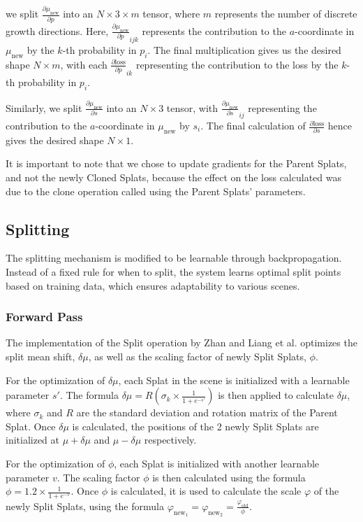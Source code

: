 \documentclass[11pt]{report}
\begin{document}
we split $\frac{\partial \mu_{\text{new}}}{\partial p}$ into an $N \times 3 \times m$ tensor, where $m$ represents the number of discrete growth directions. Here, $\frac{\partial \mu_{\text{new}}}{\partial p}_{ijk}$ represents the contribution to the $a$-coordinate in $\mu_{\text{new}}$ by the $k$-th probability in $p_i$. The final multiplication gives us the desired shape $N \times m$, with each $\frac{\partial \text{loss}}{\partial p}_{ik}$ representing the contribution to the loss by the $k$-th probability in $p_i$.

Similarly, we split $\frac{\partial \mu_{\text{new}}}{\partial s}$ into an $N \times 3$ tensor, with $\frac{\partial \mu_{\text{new}}}{\partial s}_{ij}$ representing the contribution to the $a$-coordinate in $\mu_{\text{new}}$ by $s_{i}$. The final calculation of $\frac{\partial \text{loss}}{\partial s}$ hence gives the desired shape $N \times 1$.

It is important to note that we chose to update gradients for the Parent Splats, and not the newly Cloned Splats, because the effect on the loss calculated was due to the clone operation called using the Parent Splats' parameters.

\subsection{Splitting}
The splitting mechanism is modified to be learnable through backpropagation. Instead of a fixed rule for when to split, the system learns optimal split points based on training data, which ensures adaptability to various scenes.

\subsubsection{Forward Pass}
The implementation of the Split operation by Zhan and Liang et al. optimizes the split mean shift, $\delta \mu$, as well as the scaling factor of newly Split Splats, $\phi$.

For the optimization of $\delta \mu$, each Splat in the scene is initialized with a learnable parameter $s'$. The formula $\delta \mu = R(\sigma_{k} \times \frac{1}{1 + e^{-s'}})$ is then applied to calculate $\delta \mu$, where $\sigma_{k}$ and $R$ are the standard deviation and rotation matrix of the Parent Splat. Once $\delta \mu$ is calculated, the positions of the 2 newly Split Splats are initialized at $\mu + \delta \mu$ and $\mu - \delta \mu$ respectively.

For the optimization of $\phi$, each Splat is initialized with another learnable parameter $v$. The scaling factor $\phi$ is then calculated using the formula $\phi = 1.2 \times \frac{1}{1 + e^{-v}}$. Once $\phi$ is calculated, it is used to calculate the scale $\varphi$ of the newly Split Splats, using the formula $\varphi_{\text{new}_1} =  \varphi_{\text{new}_2} = \frac{\varphi_{\text{old}}}{\phi}$.
\end{document}
